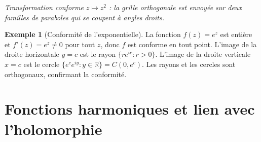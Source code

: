 \documentclass[12pt,a4paper,openany]{book}
\theoremstyle{definition}
\newtheorem{exemple}[definition]{Exemple}
\theoremstyle{plain}
\theoremstyle{remark}
\newcommand{\R}{\mathbb{R}}
\begin{document}
\begin{center}

\medskip
\textit{Transformation conforme $z \mapsto z^2$ : la grille orthogonale est envoyée sur deux familles de paraboles qui se coupent à angles droits.}
\end{center}

\begin{exemple}[Conformité de l'exponentielle]\label{ex:conformite-exp}
La fonction $f(z) = e^z$ est entière et $f'(z) = e^z \neq 0$ pour tout $z$, donc $f$ est conforme en tout point. L'image de la droite horizontale $y = c$ est le rayon $\{re^{ic} : r > 0\}$. L'image de la droite verticale $x = c$ est le cercle $\{e^c e^{iy} : y \in \R\} = C(0, e^c)$. Les rayons et les cercles sont orthogonaux, confirmant la conformité.
\end{exemple}

\section{Fonctions harmoniques et lien avec l'holomorphie}\label{sec:harmoniques}
\end{document}
